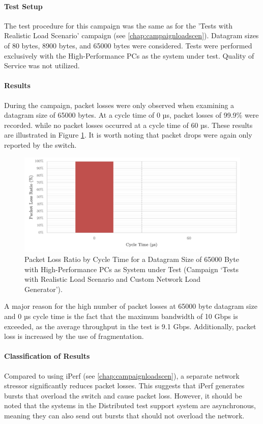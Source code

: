 \paragraph{Test Setup}
The test procedure for this campaign was the same as for the 'Tests with Realistic Load Scenario' campaign (see \ref{chap:campaignloadscen}). Datagram sizes of 80 bytes, 8900 bytes, and 65000 bytes were considered. Tests were performed exclusively with the High-Performance PCs as the system under test. Quality of Service was not utilized.

\paragraph{Results}

During the campaign, packet losses were only observed when examining a datagram size of 65000 bytes. At a cycle time of 0 µs, packet losses of 99.9\% were recorded. while no packet losses occurred at a cycle time of 60 µs. These results are illustrated in Figure \ref{fig:srpr5}. It is worth noting that packet drops were again only reported by the switch.

\begin{figure}[h!]
    \centering
    \includegraphics[width=1\linewidth]{figures/reliability/star/rel_d_5.pdf}
    \caption{Packet Loss Ratio by Cycle Time for a Datagram Size of 65000 Byte with High-Performance PCs as System under Test (Campaign `Tests with Realistic Load Scenario and Custom Network Load Generator').}    \label{fig:srpr5}
\end{figure}

A major reason for the high number of packet losses at 65000 byte datagram size and 0 µs cycle time is the fact that the maximum bandwidth of 10 Gbps is exceeded, as the average throughput in the test is 9.1 Gbps. Additionally, packet loss is increased by the use of fragmentation.

\paragraph{Classification of Results}
Compared to using iPerf (see \ref{chap:campaignloadscen}), a separate network stressor significantly reduces packet losses. This suggests that iPerf generates bursts that overload the switch and cause packet loss. However, it should be noted that the systems in the Distributed test support system are asynchronous, meaning they can also send out bursts that should not overload the network.

